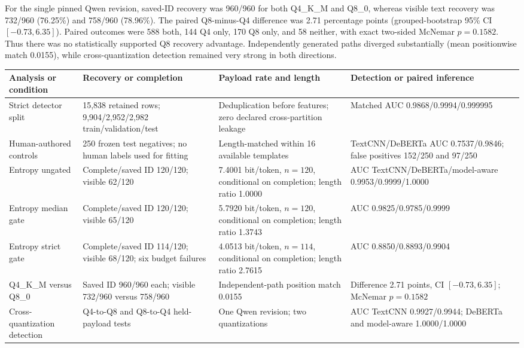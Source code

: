\documentclass[fleqn,10pt]{wlscirep}
\begin{document}
For the single pinned Qwen revision, saved-ID recovery was 960/960 for both Q4\_K\_M and Q8\_0, whereas visible text recovery was 732/960 (76.25\%) and 758/960 (78.96\%). The paired Q8-minus-Q4 difference was 2.71 percentage points (grouped-bootstrap 95\% CI \([-0.73,6.35]\)). Paired outcomes were 588 both, 144 Q4 only, 170 Q8 only, and 58 neither, with exact two-sided McNemar \(p=0.1582\). Thus there was no statistically supported Q8 recovery advantage. Independently generated paths diverged substantially (mean positionwise match 0.0155), while cross-quantization detection remained very strong in both directions.

\begin{table}[H]
\centering
\footnotesize
\setlength{\tabcolsep}{3pt}
\begin{tabularx}{\textwidth}{L{0.17\textwidth}L{0.25\textwidth}L{0.24\textwidth}Y}
\toprule
Analysis or condition & Recovery or completion & Payload rate and length & Detection or paired inference \\
\midrule
Strict detector split & 15,838 retained rows; 9,904/2,952/2,982 train/validation/test & Deduplication before features; zero declared cross-partition leakage & Matched AUC 0.9868/0.9994/0.999995 \\
Human-authored controls & 250 frozen test negatives; no human labels used for fitting & Length-matched within 16 available templates & TextCNN/DeBERTa AUC 0.7537/0.9846; false positives 152/250 and 97/250 \\
Entropy ungated & Complete/saved ID 120/120; visible 62/120 & 7.4001 bit/token, \(n=120\), conditional on completion; length ratio 1.0000 & AUC TextCNN/DeBERTa/model-aware 0.9953/0.9999/1.0000 \\
Entropy median gate & Complete/saved ID 120/120; visible 65/120 & 5.7920 bit/token, \(n=120\), conditional on completion; length ratio 1.3743 & AUC 0.9825/0.9785/0.9999 \\
Entropy strict gate & Complete/saved ID 114/120; visible 68/120; six budget failures & 4.0513 bit/token, \(n=114\), conditional on completion; length ratio 2.7615 & AUC 0.8850/0.8893/0.9904 \\
Q4\_K\_M versus Q8\_0 & Saved ID 960/960 each; visible 732/960 versus 758/960 & Independent-path position match 0.0155 & Difference 2.71 points, CI \([-0.73,6.35]\); McNemar \(p=0.1582\) \\
Cross-quantization detection & Q4-to-Q8 and Q8-to-Q4 held-payload tests & One Qwen revision; two quantizations & AUC TextCNN 0.9927/0.9944; DeBERTa and model-aware 1.0000/1.0000 \\

\end{tabularx}
\end{table}
\end{document}
